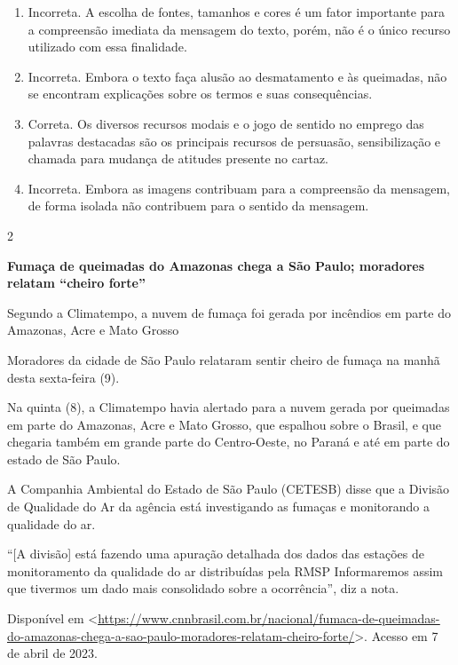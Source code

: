 {{\begin{itemize}
\begin{itemize}
\begin{enumerate}
\def\labelenumi{\arabic{enumi}.}
\item
  Incorreta. A escolha de fontes, tamanhos e cores é um fator importante
  para a compreensão imediata da mensagem do texto, porém, não é o único
  recurso utilizado com essa finalidade.
\item
  Incorreta. Embora o texto faça alusão ao desmatamento e às queimadas,
  não se encontram explicações sobre os termos e suas consequências.
\item
  Correta. Os diversos recursos modais e o jogo de sentido no emprego
  das palavras destacadas são os principais recursos de persuasão,
  sensibilização e chamada para mudança de atitudes presente no cartaz.
\item
  Incorreta. Embora as imagens contribuam para a compreensão da
  mensagem, de forma isolada não contribuem para o sentido da mensagem.
\end{enumerate}

\num{2}

\textbf{Fumaça de queimadas do Amazonas chega a São Paulo; moradores
relatam ``cheiro forte''}

Segundo a Climatempo, a nuvem de fumaça foi gerada por incêndios em
parte do Amazonas, Acre e Mato Grosso

Moradores da cidade de São Paulo relataram sentir cheiro de fumaça na
manhã desta sexta-feira (9).

Na quinta (8), a Climatempo havia alertado para a nuvem gerada por
queimadas em parte do Amazonas, Acre e Mato Grosso, que espalhou sobre o
Brasil, e que chegaria também em grande parte do Centro-Oeste, no Paraná
e até em parte do estado de São Paulo.

A Companhia Ambiental do Estado de São Paulo (CETESB) disse que a
Divisão de Qualidade do Ar da agência está investigando as fumaças e
monitorando a qualidade do ar.

``{[}A divisão{]} está fazendo uma apuração detalhada dos dados das
estações de monitoramento da qualidade do ar distribuídas pela RMSP
Informaremos assim que tivermos um dado mais consolidado sobre a
ocorrência'', diz a nota.

Disponível em
\textless{}\href{https://www.cnnbrasil.com.br/nacional/fumaca-de-queimadas-do-amazonas-chega-a-sao-paulo-moradores-relatam-cheiro-forte/}{\uline{https://www.cnnbrasil.com.br/nacional/fumaca-de-queimadas-do-amazonas-chega-a-sao-paulo-moradores-relatam-cheiro-forte/}}\textgreater.
Acesso em 7 de abril de 2023.


\end{itemize}
\end{itemize}}}

